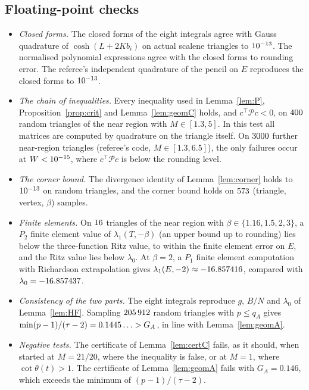 \documentclass[11pt]{article}
\theoremstyle{remark}
\newcommand{\E}{E}
\begin{document}
\subsection{Floating-point checks}
\begin{itemize}
\item \emph{Closed forms.} The closed forms of the eight integrals agree with Gauss quadrature of
$\cosh(L+2Kb_i)$ on actual scalene triangles to $10^{-13}$. The normalised polynomial expressions
agree with the closed forms to rounding error. The referee's independent quadrature of the pencil on $\E$
reproduces the closed forms to $10^{-13}$.
\item \emph{The chain of inequalities.} Every inequality used in Lemma~\ref{lem:P},
Proposition~\ref{prop:crit} and Lemma~\ref{lem:geomC} holds, and $c^\top\mathcal Pc<0$, on
$400$ random triangles of the near region with $M\in[1.3,5]$. In this test all matrices are
computed by quadrature on the triangle itself. On $3000$ further near-region triangles
(referee's code, $M\in[1.3,6.5]$), the only failures occur at $W<10^{-15}$, where $c^\top\mathcal Pc$ is
below the rounding level.
\item \emph{The corner bound.} The divergence identity of Lemma~\ref{lem:corner} holds to $10^{-13}$ on
random triangles, and the corner bound holds on $573$ (triangle, vertex, $\beta$) samples.
\item \emph{Finite elements.} On $16$ triangles of the near region with
$\beta\in\{1.16,1.5,2,3\}$, a $P_2$ finite element value of $\lambda_1(T,-\beta)$ (an upper bound up to
rounding) lies below the three-function Ritz value, to within the finite element error on $\E$, and the
Ritz value lies below $\lambda_0$. At $\beta=2$, a $P_1$ finite element computation with Richardson
extrapolation gives $\lambda_1(\E,-2)\approx\cllamFEMtwo$, compared with $\lambda_0=-16.857437$.
\item \emph{Consistency of the two parts.} The eight integrals reproduce $g$, $B/N$ and $\lambda_0$ of
Lemma~\ref{lem:HF}. Sampling $205\,912$ random triangles with $p\le q_A$ gives
$\min(p-1)/(\tau-2)=0.1445\ldots>G_A$, in line with Lemma~\ref{lem:geomA}.
\item \emph{Negative tests.} The certificate of Lemma~\ref{lem:certC} fails, as it should, when started at
$M=21/20$, where the inequality is false, or at $M=1$, where $\cot\theta(t)>1$. The certificate of
Lemma~\ref{lem:geomA} fails with $G_A=0.146$, which exceeds the minimum of $(p-1)/(\tau-2)$.
\end{itemize}
\end{document}
